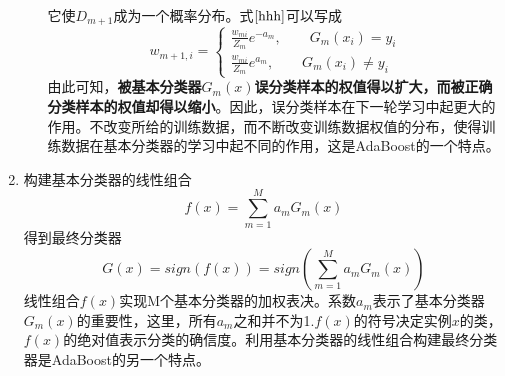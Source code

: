 \begin{enumerate}[(1)]
\begin{enumerate}[a.]
\begin{equation}
		\end{equation}
		它使$D_{m+1}$成为一个概率分布。式$\ref{hhh}$可以写成
		\begin{equation}
			w_{m+1,i}=
			\begin{cases}
			\frac{w_{mi}}{Z_m}e^{-a_m},\qquad G_m(x_i)=y_i\\
			\frac{w_{mi}}{Z_m}e^{a_m},\qquad G_m(x_i)\ne y_i
			\end{cases}
		\end{equation}
		由此可知，\textbf{被基本分类器$G_m(x)$误分类样本的权值得以扩大，而被正确分类样本的权值却得以缩小}。因此，误分类样本在下一轮学习中起更大的作用。不改变所给的训练数据，而不断改变训练数据权值的分布，使得训练数据在基本分类器的学习中起不同的作用，这是AdaBoost的一个特点。
	\end{enumerate}
	\item 构建基本分类器的线性组合
	\begin{equation}
	\label{88}
		f(x) = \sum_{m=1}^Ma_mG_m(x)
	\end{equation}
	得到最终分类器
	\begin{equation}
	\label{87}
		G(x) = sign(f(x)) = sign\left( \sum_{m=1}^Ma_mG_m(x) \right)
	\end{equation}
	线性组合$f(x)$实现M个基本分类器的加权表决。系数$a_m$表示了基本分类器$G_m(x)$的重要性，这里，所有$a_m$之和并不为1.$f(x)$的符号决定实例$x$的类，$f(x)$的绝对值表示分类的确信度。利用基本分类器的线性组合构建最终分类器是AdaBoost的另一个特点。
\end{enumerate}

